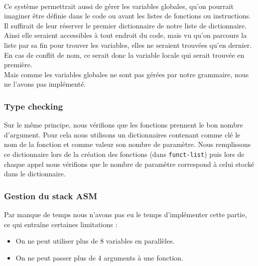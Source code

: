 \documentclass[a4paper,10pt]{article}
\begin{document}
		~\\
		Ce système permettrait aussi de gérer les variables globales, qu'on pourrait imaginer être définie dans le code ou avant les listes de fonctions ou instructions. Il suffirait de leur réserver le premier dictionnaire de notre liste de dictionnaire. Ainsi elle seraient accessibles à tout endroit du code, mais vu qu'on parcours la liste par sa fin pour trouver les variables, elles ne seraient trouvées qu'en dernier. En cas de conflit de nom, ce serait donc la variable locale qui serait trouvée en première.\\
		Mais comme les variables globales ne sont pas gérées par notre grammaire, nous ne l'avons pas implémenté.


	\subsubsection{Type checking}
		Sur le même principe, nous vérifions que les fonctions prennent le bon nombre d'argument. Pour cela nous utilisons un dictionnaires contenant comme clé le nom de la fonction et comme valeur son nombre de paramètre. Nous remplissons ce dictionnaire lors de la création des fonctions (dans \verb?funct-list?) puis lors de chaque appel nous vérifions que le nombre de paramètre correspond à celui stocké dans le dictionnaire.

	\subsubsection{Gestion du stack ASM}
		\label{sct:gestionStack}
		Par manque de temps nous n'avons pas eu le temps d'implémenter cette partie, ce qui entraîne certaines limitations : \begin{itemize}
			\item On ne peut utiliser plus de 8 variables en parallèles.
			\item On ne peut passer plus de 4 arguments à une fonction.
		\end{itemize}
\end{document}
